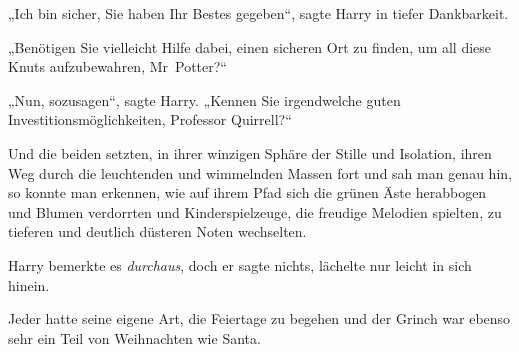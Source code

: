 „Ich bin sicher, Sie haben Ihr Bestes gegeben“, sagte Harry in tiefer Dankbarkeit.

„Benötigen Sie vielleicht Hilfe dabei, einen sicheren Ort zu finden, um all diese Knuts aufzubewahren, Mr~Potter?“

„Nun, sozusagen“, sagte Harry.
„Kennen Sie irgendwelche guten Investitionsmöglichkeiten, Professor Quirrell?“

Und die beiden setzten, in ihrer winzigen Sphäre der Stille und Isolation, ihren Weg durch die leuchtenden und wimmelnden Massen fort und sah man genau hin, so konnte man erkennen, wie auf ihrem Pfad sich die grünen Äste herabbogen und Blumen verdorrten und Kinderspielzeuge, die freudige Melodien spielten, zu tieferen und deutlich düsteren Noten wechselten.

Harry bemerkte es \emph{durchaus}, doch er sagte nichts, lächelte nur leicht in sich hinein.

Jeder hatte seine eigene Art, die Feiertage zu begehen und der Grinch war ebenso sehr ein Teil von Weihnachten wie Santa.

